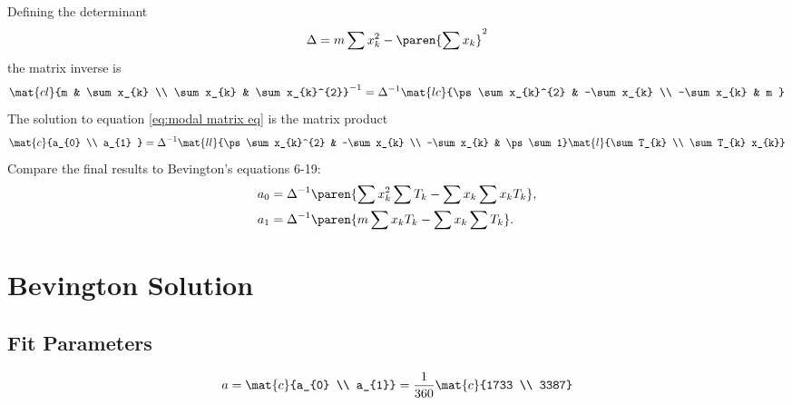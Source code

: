 Defining the determinant
  \begin{equation*}   %
    \Delta = m \sum x_{k}^{2} - \paren{\sum x_{k}}^{2}
  \end{equation*}
the matrix inverse is
  \begin{equation*}   %
    \mat{cl}{m & \sum x_{k} \\ \sum x_{k} & \sum x_{k}^{2}}^{-1} = \Delta^{-1} 
    \mat{lc}{\ps \sum x_{k}^{2} & -\sum x_{k} \\ -\sum x_{k} & m }
  \end{equation*}
The solution to equation \eqref{eq:modal matrix eq} is the matrix product
  \begin{equation*}
    \mat{c}{a_{0} \\ a_{1} } = \Delta^{-1}
    \mat{ll}{\ps \sum x_{k}^{2} & -\sum x_{k} \\ -\sum x_{k} & \ps \sum 1}
    \mat{l}{\sum T_{k} \\ \sum T_{k} x_{k}}
    \label{eqn:bevington solution product}
  \end{equation*}
Compare the final results to Bevington's equations 6-19:
  \begin{equation*}
  \begin{split}
    a_{0} &= \Delta^{-1} \paren{\sum x_{k}^{2}\sum T_{k} - \sum x_{k}\sum x_{k}T_{k}}, \\
    a_{1} &= \Delta^{-1} \paren{m \sum x_{k}T_{k} - \sum x_{k}\sum T_{k}}.
  \label{eqn:bevington soln}
  \end{split}
  \end{equation*}
  
\section{\label{sec:bevington example}Bevington Solution}  %

\subsection{Fit Parameters}  %
  \begin{equation*}   %
      a = \mat{c}{a_{0} \\ a_{1}} = \frac{1}{360} \mat{c}{1733 \\ 3387}
  \end{equation*}

